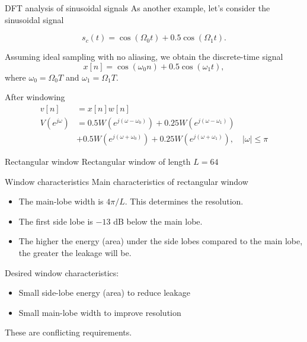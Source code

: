 \documentclass[10pt]{beamer}
\begin{document}
\begin{frame}{DFT analysis of sinusoidal signals}
As another example, let's consider the sinusoidal signal

\begin{equation*}
	s_c(t) = \cos(\Omega_0t) + 0.5\cos(\Omega_1t).
\end{equation*}

Assuming ideal sampling with no aliasing, we obtain the discrete-time signal
\begin{equation*}
 	x[n] = \cos(\omega_0n) + 0.5\cos(\omega_1t),
\end{equation*}
where $\omega_0 = \Omega_0 T$ and $\omega_1 = \Omega_1 T$.

After windowing
\begin{align*}
	v[n] &= x[n]w[n] \\
	V(e^{j\omega}) &= 0.5W(e^{j(\omega-\omega_0)}) + 0.25W(e^{j(\omega-\omega_1)}) \\
	& + 0.5W(e^{j(\omega+\omega_0)}) + 0.25W(e^{j(\omega+\omega_1)}), \quad |\omega|\leq\pi
\end{align*}
\end{frame}

%
\begin{frame}{Rectangular window}
Rectangular window of length $L = 64$

\begin{center}
	\resizebox{0.9\textwidth}{!}{}
\end{center}

\end{frame}

\begin{frame}{Window characteristics}
Main characteristics of rectangular window
	\begin{itemize}
		\item The main-lobe width is $4\pi/L$. This determines the resolution.
		\item The first side lobe is $-13$ dB below the main lobe.
		\item The higher the energy (area) under the side lobes compared to the main lobe, the greater the leakage will be. 
	\end{itemize}

Desired window characteristics:
\begin{itemize}
		\item Small side-lobe energy (area) to reduce leakage
		\item Small main-lobe width to improve resolution
\end{itemize}
These are conflicting requirements.
\end{frame}
\end{document}
